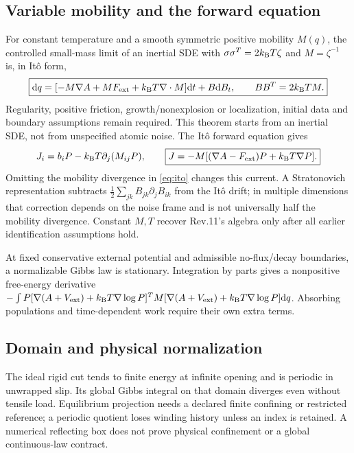 \documentclass[11pt]{article}
\newcommand{\kb}{k_{\rm B}}
\newcommand{\dd}{\mathrm d}
\begin{document}
\subsection{Variable mobility and the forward equation}
For constant temperature and a smooth symmetric positive mobility $M(q)$,
the controlled small-mass limit of an inertial SDE with
$\sigma\sigma^T=2\kb T\zeta$ and $M=\zeta^{-1}$ is, in It\^o form,
\begin{equation}
\boxed{\dd q=[-M\nabla A+MF_{\rm ext}+\kb T\nabla\cdot M]\dd t
                  +B\dd B_t,\qquad BB^T=2\kb T M.}
\label{eq:ito}
\end{equation}
Regularity, positive friction, growth/nonexplosion or localization, initial
data and boundary assumptions remain required\cite{Hottovy2015}. This
theorem starts from an inertial SDE, not from unspecified atomic noise.
The It\^o forward equation gives
\begin{equation}
J_i=b_iP-\kb T\partial_j(M_{ij}P),\qquad
\boxed{J=-M[(\nabla A-F_{\rm ext})P+\kb T\nabla P].}
\label{eq:current}
\end{equation}
Omitting the mobility divergence in \eqref{eq:ito} changes this current.
A Stratonovich representation subtracts
$\tfrac12\sum_{jk}B_{jk}\partial_j B_{ik}$ from the It\^o drift; in
multiple dimensions that correction depends on the noise frame and is
not universally half the mobility divergence. Constant $M,T$ recover
Rev.11's algebra only after all earlier identification assumptions hold.

At fixed conservative external potential and admissible no-flux/decay
boundaries, a normalizable Gibbs law is stationary. Integration by parts
gives a nonpositive free-energy derivative
$-\int P[\nabla(A+V_{\rm ext})+\kb T\nabla\log P]^T
M[\nabla(A+V_{\rm ext})+\kb T\nabla\log P]\dd q$.
Absorbing populations and time-dependent work require their own extra terms.

\subsection{Domain and physical normalization}
The ideal rigid cut tends to finite energy at infinite opening and is
periodic in unwrapped slip. Its global Gibbs integral on that domain
diverges even without tensile load. Equilibrium projection needs a declared
finite confining or restricted reference; a periodic quotient loses winding
history unless an index is retained. A numerical reflecting box does not
prove physical confinement or a global continuous-law contract.
\end{document}

